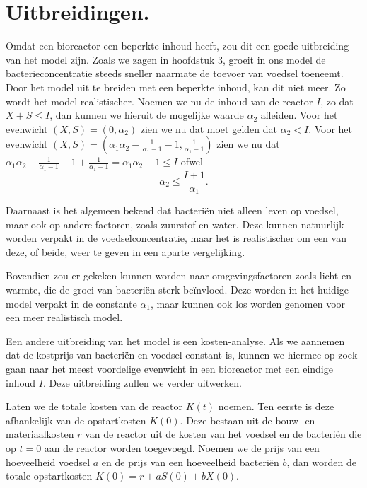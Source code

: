 
\chapter{Uitbreidingen.}
\label{Uitbreidingen}

Omdat een bioreactor een beperkte inhoud heeft, zou dit een goede uitbreiding van het model zijn. Zoals we zagen in hoofdstuk 3, groeit in ons model de bacterieconcentratie steeds sneller naarmate de toevoer van voedsel toeneemt. Door het model uit te breiden met een beperkte inhoud, kan dit niet meer. Zo wordt het model realistischer. Noemen we nu de inhoud van de reactor $I$, zo dat $X + S \leq I$, dan kunnen we hieruit de mogelijke waarde $\alpha_2$ afleiden. Voor het evenwicht $(X,S) = (0,\alpha_2)$ zien we nu dat moet gelden dat $\alpha_2 < I$. Voor het evenwicht $(X,S) = (\alpha_1\alpha_2-\frac{1}{\alpha_1-1}-1, \frac{1}{\alpha_1-1})$ zien we nu dat $\alpha_1\alpha_2-\frac{1}{\alpha_1-1}-1 + \frac{1}{\alpha_1-1} = \alpha_1\alpha_2 - 1 \leq I$ ofwel
\begin{equation}
\alpha_2 \leq \frac{I + 1}{\alpha_1}. \label{eq:boundary}
\end{equation}

Daarnaast is het algemeen bekend dat bacteri\"en niet alleen leven op voedsel, maar ook op andere factoren, zoals zuurstof en water. Deze kunnen natuurlijk worden verpakt in de voedselconcentratie, maar het is realistischer om een van deze, of beide, weer te geven in een aparte vergelijking. 

Bovendien zou er gekeken kunnen worden naar omgevingsfactoren zoals licht en warmte, die de groei van bacteri\"en sterk be\"invloed. Deze worden in het huidige model verpakt in de constante $\alpha_1$, maar kunnen ook los worden genomen voor een meer realistisch model. 

Een andere uitbreiding van het model is een kosten-analyse. Als we aannemen dat de kostprijs van bacteri\"en en voedsel constant is, kunnen we hiermee op zoek gaan naar het meest voordelige evenwicht in een bioreactor met een eindige inhoud $I$. Deze uitbreiding zullen we verder uitwerken.

Laten we de totale kosten van de reactor $K(t)$ noemen. Ten eerste is deze afhankelijk van de opstartkosten $K(0)$. Deze bestaan uit de bouw- en materiaalkosten $r$ van de reactor uit de kosten van het voedsel en de bacteri\"en die op $t=0$ aan de reactor worden toegevoegd. Noemen we de prijs van een hoeveelheid voedsel $a$ en de prijs van een hoeveelheid bacteri\"en $b$, dan worden de totale opstartkosten $K(0) = r + aS(0) + bX(0)$.

